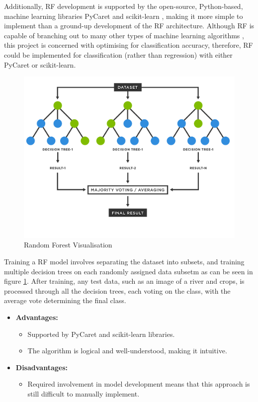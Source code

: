 Additionally, RF development is supported by the open-source, Python-based, machine learning libraries PyCaret \citep{ali_2020} and scikit-learn \citep{scikit-learn_2018}, making it more simple to implement than a ground-up development of the RF architecture. Although RF is capable of branching out to many other types of machine learning algorithms \citep{quintana_2024_analysis}, this project is concerned with optimising for classification accuracy, therefore, RF could be implemented for classification (rather than regression) with either PyCaret or scikit-learn. 

\begin{figure}[ht]
    \centering
    \includegraphics[width=0.5\linewidth]{contents/figures/LR RF diagram.jpg}
    \caption{Random Forest Visualisation \citep{verma_2022}}
    \label{fig:LR RF diagram}
\end{figure}

Training a RF model involves separating the dataset into subsets, and training multiple decision trees on each randomly assigned data subsetm as can be seen in figure \ref{fig:LR RF diagram}. After training, any test data, such as an image of a river and crops, is processed through all the decision trees, each voting on the class, with the average vote determining the final class. 

\begin{itemize}
    \item \textbf{Advantages:}
    \begin{itemize}
        \item Supported by PyCaret and scikit-learn libraries.
        \item The algorithm is logical and well-understood, making it intuitive. 
    \end{itemize}
    \item \textbf{Disadvantages:}
    \begin{itemize}
        \item Required involvement in model development means that this approach is still difficult to manually implement. 
    \end{itemize}
\end{itemize}

